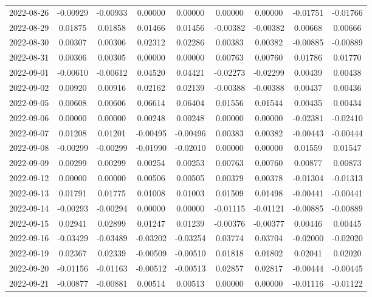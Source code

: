 {\begin{footnotesize}
\begin{longtable}{lcccccccc}
2022-08-26 & -0.00929 & -0.00933 & 0.00000 & 0.00000 & 0.00000 & 0.00000 & -0.01751 & -0.01766 \\
2022-08-29 & 0.01875 & 0.01858 & 0.01466 & 0.01456 & -0.00382 & -0.00382 & 0.00668 & 0.00666 \\
2022-08-30 & 0.00307 & 0.00306 & 0.02312 & 0.02286 & 0.00383 & 0.00382 & -0.00885 & -0.00889 \\
2022-08-31 & 0.00306 & 0.00305 & 0.00000 & 0.00000 & 0.00763 & 0.00760 & 0.01786 & 0.01770 \\
2022-09-01 & -0.00610 & -0.00612 & 0.04520 & 0.04421 & -0.02273 & -0.02299 & 0.00439 & 0.00438 \\
2022-09-02 & 0.00920 & 0.00916 & 0.02162 & 0.02139 & -0.00388 & -0.00388 & 0.00437 & 0.00436 \\
2022-09-05 & 0.00608 & 0.00606 & 0.06614 & 0.06404 & 0.01556 & 0.01544 & 0.00435 & 0.00434 \\
2022-09-06 & 0.00000 & 0.00000 & 0.00248 & 0.00248 & 0.00000 & 0.00000 & -0.02381 & -0.02410 \\
2022-09-07 & 0.01208 & 0.01201 & -0.00495 & -0.00496 & 0.00383 & 0.00382 & -0.00443 & -0.00444 \\
2022-09-08 & -0.00299 & -0.00299 & -0.01990 & -0.02010 & 0.00000 & 0.00000 & 0.01559 & 0.01547 \\
2022-09-09 & 0.00299 & 0.00299 & 0.00254 & 0.00253 & 0.00763 & 0.00760 & 0.00877 & 0.00873 \\
2022-09-12 & 0.00000 & 0.00000 & 0.00506 & 0.00505 & 0.00379 & 0.00378 & -0.01304 & -0.01313 \\
2022-09-13 & 0.01791 & 0.01775 & 0.01008 & 0.01003 & 0.01509 & 0.01498 & -0.00441 & -0.00441 \\
2022-09-14 & -0.00293 & -0.00294 & 0.00000 & 0.00000 & -0.01115 & -0.01121 & -0.00885 & -0.00889 \\
2022-09-15 & 0.02941 & 0.02899 & 0.01247 & 0.01239 & -0.00376 & -0.00377 & 0.00446 & 0.00445 \\
2022-09-16 & -0.03429 & -0.03489 & -0.03202 & -0.03254 & 0.03774 & 0.03704 & -0.02000 & -0.02020 \\
2022-09-19 & 0.02367 & 0.02339 & -0.00509 & -0.00510 & 0.01818 & 0.01802 & 0.02041 & 0.02020 \\
2022-09-20 & -0.01156 & -0.01163 & -0.00512 & -0.00513 & 0.02857 & 0.02817 & -0.00444 & -0.00445 \\
2022-09-21 & -0.00877 & -0.00881 & 0.00514 & 0.00513 & 0.00000 & 0.00000 & -0.01116 & -0.01122 \\

\end{longtable}
\end{footnotesize}}
